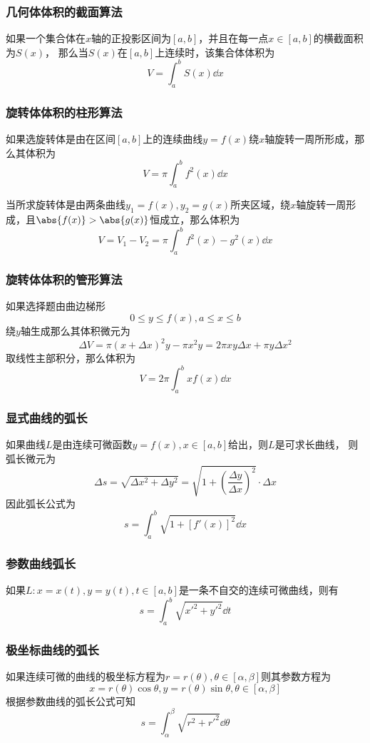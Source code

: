 \subsubsection{几何体体积的截面算法}
如果一个集合体在$x$轴的正投影区间为$[a,b]$，并且在每一点$x\in[a,b]$的横截面积为$S(x)$，
那么当$S(x)$在$[a,b]$上连续时，该集合体体积为
\[ V = \int_a^b S(x)\dd{x} \]

\subsubsection{旋转体体积的柱形算法}
如果选旋转体是由在区间$[a,b]$上的连续曲线$y=f(x)$绕$x$轴旋转一周所形成，那么其体积为
\[ V = \pi\int_a^bf^2(x)\dd{x} \]

当所求旋转体是由两条曲线$y_1=f(x),y_2=g(x)$所夹区域，绕$x$轴旋转一周形成，且$\abs{f(x)} > \abs{g(x)}$恒成立，那么体积为
\[ V = V_1 - V_2 = \pi\int_a^b f^2(x)-g^2(x)\dd{x} \]

\subsubsection{旋转体体积的管形算法}
如果选择题由曲边梯形
\[ 0\leq y \leq f(x), a\leq x \leq b \]
绕$y$轴生成那么其体积微元为
\[ \Delta V = \pi(x+\Delta x)^2y - \pi x^2y = 2\pi xy\Delta x + \pi y\Delta x^2  \]
取线性主部积分，那么体积为
\[ V = 2\pi\int_a^bxf(x)\dd{x} \]

\subsubsection{显式曲线的弧长}
如果曲线$L$是由连续可微函数$y=f(x),x\in[a,b]$给出，则$L$是可求长曲线，
则弧长微元为
\[ \Delta s = \sqrt{\Delta x^2 + \Delta y^2} = \sqrt{1+\left(\frac{\Delta y}{\Delta x}\right)^2}\cdot \Delta x \]
因此弧长公式为
\[ s = \int_a^b \sqrt{1+[f'(x)]^2}\dd{x} \]

\subsubsection{参数曲线弧长}如果$L: x=x(t), y=y(t),t\in[a,b]$是一条不自交的连续可微曲线，则有
\[ s = \int_a^b\sqrt{x'^2+y'^2}\dd{t} \]

\subsubsection{极坐标曲线的弧长}
如果连续可微的曲线的极坐标方程为$r=r(\theta),\theta\in[\alpha,\beta]$则其参数方程为
\[ x = r(\theta)\cos\theta,y=r(\theta)\sin\theta,\theta\in[\alpha,\beta] \]
根据参数曲线的弧长公式可知
\[ s = \int_\alpha^\beta \sqrt{r^2+r'^2}\dd{\theta} \]


